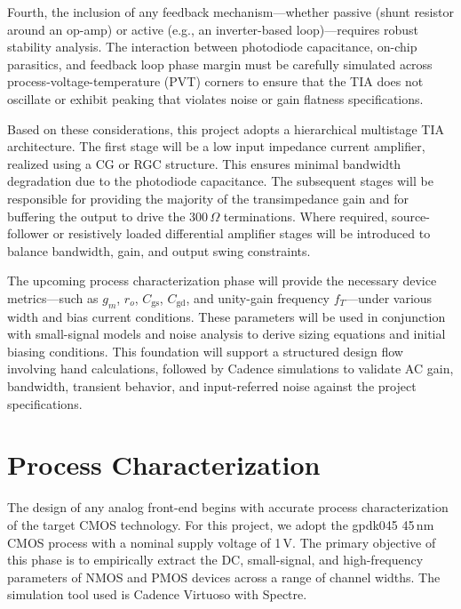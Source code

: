 \documentclass[11pt]{article}
\begin{document}
Fourth, the inclusion of any feedback mechanism---whether passive (shunt resistor around an op-amp) or active (e.g., an inverter-based loop)---requires robust stability analysis. The interaction between photodiode capacitance, on-chip parasitics, and feedback loop phase margin must be carefully simulated across process-voltage-temperature (PVT) corners to ensure that the TIA does not oscillate or exhibit peaking that violates noise or gain flatness specifications.

Based on these considerations, this project adopts a hierarchical multistage TIA architecture. The first stage will be a low input impedance current amplifier, realized using a CG or RGC structure. This ensures minimal bandwidth degradation due to the photodiode capacitance. The subsequent stages will be responsible for providing the majority of the transimpedance gain and for buffering the output to drive the 300\,$\Omega$ terminations. Where required, source-follower or resistively loaded differential amplifier stages will be introduced to balance bandwidth, gain, and output swing constraints.

The upcoming process characterization phase will provide the necessary device metrics---such as $g_m$, $r_o$, $C_{\text{gs}}$, $C_{\text{gd}}$, and unity-gain frequency $f_T$---under various width and bias current conditions. These parameters will be used in conjunction with small-signal models and noise analysis to derive sizing equations and initial biasing conditions. This foundation will support a structured design flow involving hand calculations, followed by Cadence simulations to validate AC gain, bandwidth, transient behavior, and input-referred noise against the project specifications.





\newpage

\section{Process Characterization}

The design of any analog front-end begins with accurate process characterization of the target CMOS technology. For this project, we adopt the gpdk045 45\,nm CMOS process with a nominal supply voltage of 1\,V. The primary objective of this phase is to empirically extract the DC, small-signal, and high-frequency parameters of NMOS and PMOS devices across a range of channel widths. The simulation tool used is Cadence Virtuoso with Spectre.
\end{document}
